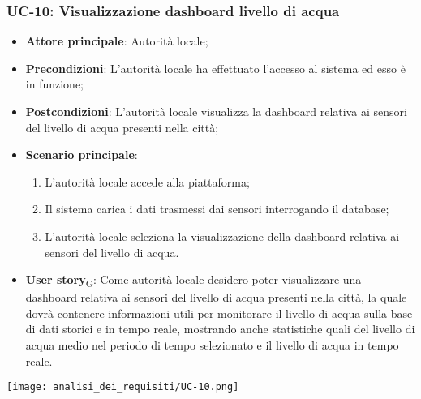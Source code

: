 \subsubsection{UC-10: Visualizzazione dashboard livello di acqua}
\begin{itemize}
	\item \textbf{Attore principale}: Autorità locale;
	\item \textbf{Precondizioni}: L'autorità locale ha effettuato l'accesso al sistema ed esso è in funzione;
	\item \textbf{Postcondizioni}: L'autorità locale visualizza la dashboard relativa
	      ai sensori del livello di acqua presenti nella città;
	\item \textbf{Scenario principale}:
	      \begin{enumerate}
		      \item L'autorità locale accede alla piattaforma;
		      \item Il sistema carica i dati trasmessi dai sensori interrogando il database;
		      \item L'autorità locale seleziona la visualizzazione della dashboard relativa ai sensori del livello di acqua.
	      \end{enumerate}
	\item \href{https://7last.github.io/docs/rtb/documentazione-interna/glossario\#user-story}{\textbf{User story}\textsubscript{G}}:
	      Come autorità locale desidero poter visualizzare una dashboard relativa ai sensori del livello di acqua presenti nella città, la quale
	      dovrà contenere informazioni utili per monitorare il livello di acqua sulla base di dati storici e in tempo reale, mostrando
	      anche statistiche quali del livello di acqua medio nel periodo di tempo selezionato e il livello di acqua in tempo reale.
\end{itemize}
\begin{center}
	\texttt{[image: analisi\_dei\_requisiti/UC-10.png]}
\end{center}


